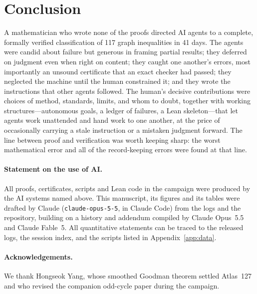\documentclass[11pt,a4paper]{article}
\newcommand{\ttt}[1]{\texttt{#1}}
\begin{document}
\section{Conclusion}

A mathematician who wrote none of the proofs directed AI agents to a complete, formally verified
classification of 117 graph inequalities in 41 days. The agents were candid about failure but generous in
framing partial results; they deferred on judgment even when right on content; they caught one another's
errors, most importantly an unsound certificate that an exact checker had passed; they neglected the machine
until the human constrained it; and they wrote the instructions that other agents followed. The human's
decisive contributions were choices of method, standards, limits, and whom to doubt, together with working
structures---autonomous goals, a ledger of failures, a Lean skeleton---that let agents work unattended and hand
work to one another, at the price of occasionally carrying a stale instruction or a mistaken judgment forward. The line between proof and
verification was worth keeping sharp: the worst mathematical error and all of the record-keeping errors were
found at that line.

\paragraph{Statement on the use of AI.} All proofs, certificates, scripts and Lean code in the campaign were
produced by the AI systems named above. This manuscript, its figures and its tables were drafted by Claude
(\ttt{claude-opus-5-5}, in Claude Code) from the logs and the repository, building on a history and addendum
compiled by Claude Opus~5.5 and Claude Fable~5. All quantitative statements can be traced to the released logs,
the session index, and the scripts listed in Appendix~\ref{app:data}.

\paragraph{Acknowledgements.} We thank Hongseok Yang, whose smoothed Goodman theorem settled Atlas~127 and who
revised the companion odd-cycle paper during the campaign.
\end{document}
